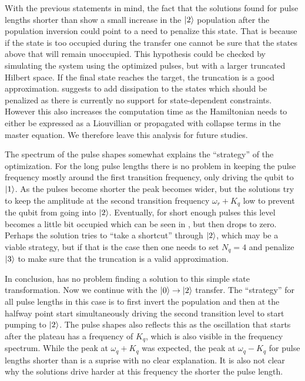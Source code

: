 \documentclass[main.tex]{subfiles}
\begin{document}
With the previous statements in mind, the fact that the solutions found for pulse lengths shorter than  show a small increase in the \(\ket{2}\) population after the population inversion could point to a need to penalize this state.
That is because if the state is too occupied during the transfer one cannot be sure that the states above that will remain unoccupied.
This hypothesis could be checked by simulating the system using the optimized pulses, but with a larger truncated Hilbert space.
If the final state reaches the target, the truncation is a good approximation.
\krotov{} suggests to add dissipation to the states which should be penalized as there is currently no support for state-dependent constraints.
However this also increases the computation time as the Hamiltonian needs to either be expressed as a Liouvillian or propagated with collapse terms in the master equation.
We therefore leave this analysis for future studies.

The spectrum of the pulse shapes somewhat explains the ``strategy'' of the optimization.
For the long pulse lengths there is no problem in keeping the pulse frequency mostly around the first transition frequency, only driving the qubit to \(\ket{1}\).
As the pulses become shorter the peak becomes wider, but the solutions try to keep the amplitude at the second transition frequency \(\omega_r+K_q\) low to prevent the qubit from going into \(\ket{2}\).
Eventually, for short enough pulses this level becomes a little bit occupied which can be seen in , but then drops to zero.
Perhaps the solution tries to ``take a shortcut'' through \(\ket{2}\), which may be a viable strategy, but if that is the case then one needs to set \(N_q = 4\) and penalize \(\ket{3}\) to make sure that the truncation is a valid approximation.

In conclusion, \krotov{} has no problem finding a solution to this simple state transformation.
Now we continue with the \(\ket{0}\rightarrow\ket{2}\) transfer.
The ``strategy'' for all pulse lengths in this case is to first invert the population and then at the halfway point start simultaneously driving the second transition level to start pumping to \(\ket{2}\).
The pulse shapes also reflects this as the oscillation that starts after the plateau has a frequency of \(K_q\), which is also visible in the frequency spectrum.
While the peak at \(\omega_q+K_q\) was expected, the peak at \(\omega_q-K_q\) for pulse lengths shorter than  is a suprise with no clear explanation.
It is also not clear why the solutions drive harder at this frequency the shorter the pulse length.
\end{document}
